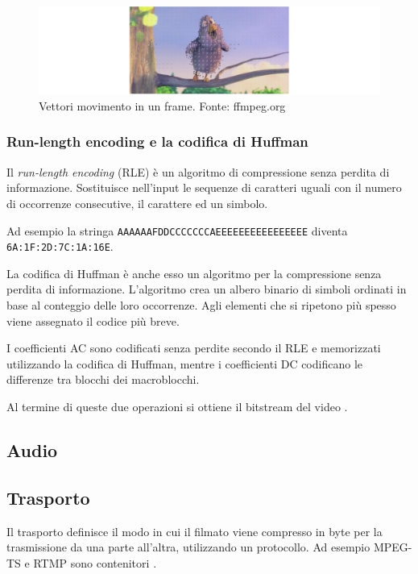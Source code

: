 \begin{figure}[H]
	\includegraphics[width=\linewidth]{immagini/motionvectors}
	\caption{Vettori movimento in un frame. Fonte: ffmpeg.org}
	\label{fig:motionvectors}
\end{figure}



\subsubsection{Run-length encoding e la codifica di Huffman}
Il \textit{run-length encoding} (RLE) è un algoritmo di compressione senza perdita di informazione. Sostituisce nell'input le sequenze di caratteri uguali con il numero di occorrenze consecutive, il carattere ed un simbolo.

Ad esempio la stringa \verb|AAAAAAFDDCCCCCCCAEEEEEEEEEEEEEEEE| diventa \verb|6A:1F:2D:7C:1A:16E|.

La codifica di Huffman è anche esso un algoritmo per la compressione senza perdita di informazione. L'algoritmo crea un albero binario di simboli ordinati in base al conteggio delle loro occorrenze. Agli elementi che si ripetono più spesso viene assegnato il codice più breve.

I coefficienti AC sono codificati senza perdite secondo il RLE e memorizzati utilizzando la codifica di Huffman, mentre i coefficienti DC codificano le differenze tra blocchi dei macroblocchi.

Al termine di queste due operazioni si ottiene il bitstream del video \parencite{jurgem_1997}.




\subsection{Audio}




\subsection{Trasporto}
Il trasporto definisce il modo in cui il filmato viene compresso in byte per la trasmissione da una parte all'altra, utilizzando un protocollo. Ad esempio MPEG-TS e RTMP sono contenitori \parencite{CombinedICTTechnologies}.


